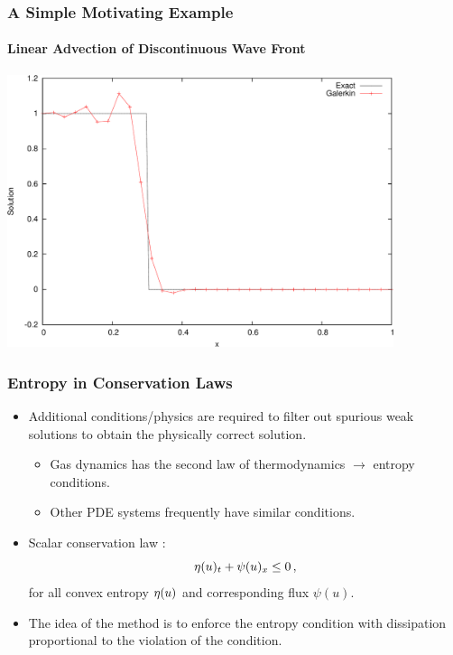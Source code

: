 \begin{frame}
\frametitle{A Simple Motivating Example}
\framesubtitle{Linear Advection of Discontinuous Wave Front}

\begin{center}
\includegraphics[width=0.85\textwidth]{./figures/advection_Galerkin.pdf}
\end{center}

\end{frame}
\begin{frame}
\frametitle{Entropy in Conservation Laws}

\begin{itemize}
  \item Additional conditions/physics are required to filter out
    spurious weak solutions to obtain the physically correct solution.
    \begin{itemize}
      \item Gas dynamics has the second law of thermodynamics
        $\rightarrow$ entropy conditions.
      \item Other PDE systems frequently have similar conditions.
    \end{itemize}
  \item Scalar conservation law :
    \begin{equation}
      \eta(u)_t + \psi(u)_x \leq 0 \,,
    \end{equation}
    for all convex entropy $\eta(u)$ and corresponding flux $\psi(u)$.
  \item The idea of the  method is to enforce
    the entropy condition with dissipation proportional to the violation
    of the condition.
\end{itemize}

\end{frame}
